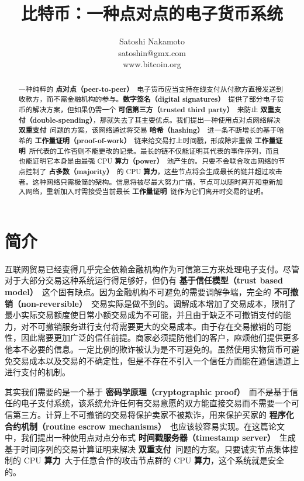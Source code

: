 \documentclass{article}
\begin{document}
\title{比特币：一种点对点的电子货币系统}
\author{
 Satoshi Nakamoto\\
 satoshin@gmx.com\\
 www.bitcoin.org\\
}
\date{}

\maketitle

\begin{abstract}
 \noindent
 一种纯粹的 \textbf{点对点（peer-to-peer）}\ 电子货币应当支持在线支付从付款方直接发送到收款方，而不需金融机构的参与。\textbf{数字签名（digital signatures）}\ 提供了部分电子货币的解决方案，但如果仍需一个 \textbf{可信第三方（trusted third party）}\ 来防止 \textbf{双重支付（double-spending）}，那就失去了其主要优点。我们提出一种使用点对点网络解决 \textbf{双重支付}\ 问题的方案，该网络通过将交易 \textbf{哈希（hashing）}\ 进一条不断增长的基于哈希的 \textbf{工作量证明（proof-of-work）}\ 链来给交易打上时间戳，形成除非重做 \textbf{工作量证明}\ 所代表的工作否则不能更改的记录。最长的链不仅能证明其代表的事件序列，而且也能证明它本身是由最强 CPU \textbf{算力（power）}\ 池产生的。只要不会联合攻击网络的节点控制了 \textbf{占多数（majority）}\ 的 CPU \textbf{算力}，这些节点将会生成最长的链并超过攻击者。这种网络只需极简的架构。信息将被尽最大努力广播，节点可以随时离开和重新加入网络，重新加入时需接受当前最长 \textbf{工作量证明}\ 链作为它们离开时交易的证明。
\end{abstract}

\section{简介}
互联网贸易已经变得几乎完全依赖金融机构作为可信第三方来处理电子支付。尽管对于大部分交易这种系统运行得足够好，但仍有 \textbf{基于信任模型（trust based model）}\ 这个固有缺点。因为金融机构不可避免的需要调解争端，完全的 \textbf{不可撤销（non-reversible）}\ 交易实际是做不到的。调解成本增加了交易成本，限制了最小实际交易额度使日常小额交易成为不可能，并且由于缺乏不可撤销支付的能力，对不可撤销服务进行支付将需要更大的交易成本。由于存在交易撤销的可能性，因此需要更加广泛的信任前提。商家必须提防他们的客户，麻烦他们提供更多他本不必要的信息。一定比例的欺诈被认为是不可避免的。虽然使用实物货币可避免交易成本以及交易的不确定性，但是不存在不引入一个信任方而能在通信通道上进行支付的机制。

其实我们需要的是一个基于 \textbf{密码学原理（cryptographic proof）}\ 而不是基于信任的电子支付系统，该系统允许任何有交易意愿的双方能直接交易而不需要一个可信第三方。计算上不可撤销的交易将保护卖家不被欺诈，用来保护买家的 \textbf{程序化合约机制（routine escrow mechanisms）}\ 也应该较容易实现。在这篇论文中，我们提出一种使用点对点分布式 \textbf{时间戳服务器（timestamp server）}\ 生成基于时间序列的交易计算证明来解决 \textbf{双重支付}\ 问题的方案。只要诚实节点集体控制的 CPU \textbf{算力}\ 大于任意合作的攻击节点群的 CPU \textbf{算力}，这个系统就是安全的。
\end{document}
